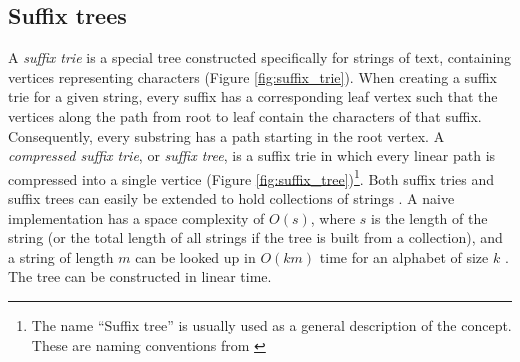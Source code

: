 \documentclass[thesis.tex]{subfiles}
\begin{document}
\subsection{Suffix trees}
A \textit{suffix trie} is a special tree constructed specifically for strings of text, containing vertices representing characters (Figure \ref{fig:suffix_trie}). When creating a suffix trie for a given string, every suffix has a corresponding leaf vertex such that the vertices along the path from root to leaf contain the characters of that suffix. Consequently, every substring has a path starting in the root vertex. A \textit{compressed suffix trie}, or \textit{suffix tree}, is a suffix trie in which every linear path is compressed into a single vertice (Figure \ref{fig:suffix_tree})\footnote{The name ``Suffix tree'' is usually used as a general description of the concept. These are naming conventions from \cite{data_structures_and_algorithm_analysis_in_java}}. Both suffix tries and suffix trees can easily be extended to hold collections of strings \cite[Chapter 20]{algorithms_sequential_parallell_and_distributed}. A naive implementation has a space complexity of $O(s)$, where $s$ is the length of the string (or the total length of all strings if the tree is built from a collection), and a string of length $m$ can be looked up in $O(km)$ time for an alphabet of size $k$ \cite[Section 20.6.1]{algorithms_sequential_parallell_and_distributed}. The tree can be constructed in linear time\cite{online_construction_of_suffix_trees}.
\clearpage\noindent
\end{document}
